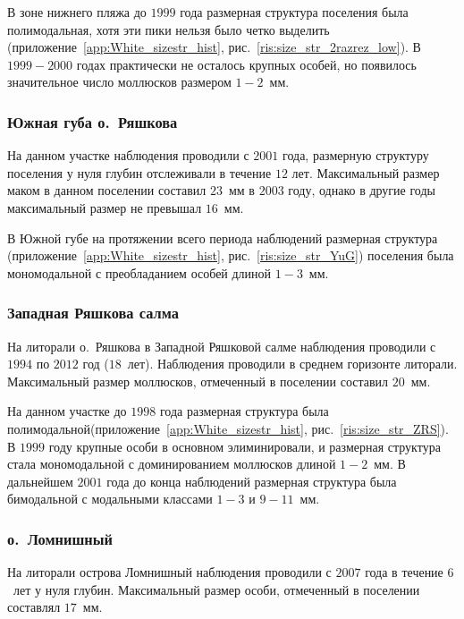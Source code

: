 В зоне нижнего пляжа до $1999$ года размерная структура поселения была полимодальная, хотя эти пики нельзя было четко выделить (приложение~\ref{app:White_sizestr_hist}, рис.~\ref{ris:size_str_2razrez_low}). 
В $1999-2000$ годах практически не осталось крупных особей, но появилось значительное число моллюсков размером $1-2$~мм. 

		\subsubsection{Южная губа о.~Ряшкова}

На данном участке наблюдения проводили с $2001$ года, размерную структуру поселения у нуля глубин отслеживали в течение $12$ лет.
Максимальный размер маком в данном поселении составил $23$~мм в $2003$ году, однако в другие годы максимальный размер не превышал $16$~мм.

В Южной губе на протяжении всего периода наблюдений размерная структура (приложение~\ref{app:White_sizestr_hist}, рис.~\ref{ris:size_str_YuG}) поселения была мономодальной с преобладанием особей длиной $1-3$~мм. 



		\subsubsection{Западная Ряшкова салма}

На литорали о.~Ряшкова в Западной Ряшковой салме наблюдения проводили с $1994$ по $2012$ год ($18$~лет). Наблюдения проводили в среднем горизонте литорали.
Максимальный размер моллюсков, отмеченный в поселении составил $20$~мм.

На данном участке  до $1998$ года размерная структура была полимодальной(приложение~\ref{app:White_sizestr_hist}, рис.~\ref{ris:size_str_ZRS}). 
В $1999$ году крупные особи в основном элиминировали, и размерная структура стала мономодальной с доминированием моллюсков длиной $1-2$~мм.
В дальнейшем $2001$ года до конца наблюдений размерная структура была бимодальной с модальными классами $1-3$ и $9-11$~мм.


		\subsubsection{о.~Ломнишный}

На литорали острова Ломнишный наблюдения проводили с $2007$ года в течение $6$~лет у нуля глубин. 
Максимальный размер особи, отмеченный в поселении составлял $17$~мм.

